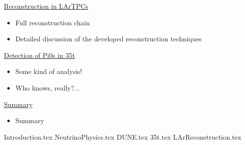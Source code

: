 \documentclass[a4paper,12pt]{report}
\begin{document}
\underline{Reconstruction in LArTPCs}
\begin{itemize}
  \item{Full reconstruction chain}
  \item{Detailed discussion of the developed reconstruction techniques}
\end{itemize}

\underline{Detection of Pi0s in 35t}
\begin{itemize}
  \item{Some kind of analysis!}
  \item{Who knows, really?...}
\end{itemize}

\underline{Summary}
\begin{itemize}
  \item{Summary}
\end{itemize}

\pagebreak


\renewcommand{\thepage}{\arabic{page}}
\setcounter{page}{1}

{Introduction.tex}
{NeutrinoPhysics.tex}
{DUNE.tex}
{35t.tex}
{LArReconstruction.tex}

\printbibliography[title={Bibliography}]
\end{document}
